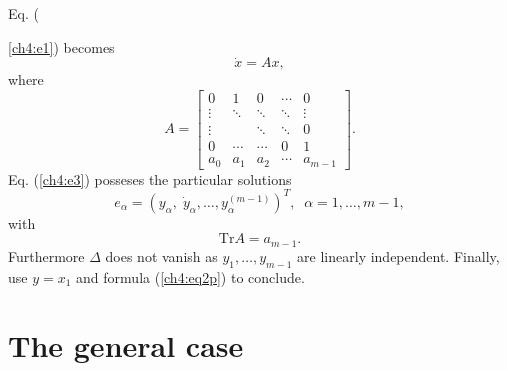 Eq. ({\ref{ch4:e1}) becomes
\begin{equation}
\dot x =Ax,\label{ch4:e3}
\end{equation}
where
\[A= \left [ \begin{array}{ccccc}
0 & 1 & 0 & \cdots &0\\
\vdots & \ddots  &\ddots &\ddots  &\vdots  \\
\vdots &  & \ddots & \ddots &0\\    
0 &\cdots &\cdots & 0 & 1\\
a_0 & a_1 & a_2 & \cdots  & a_{m-1}
\end{array} \right ]. \]
Eq. (\ref{ch4:e3}) posseses the particular solutions
\[e_{\alpha}=(y_{\alpha},\;\dot y_{\alpha},\ldots , y_{\alpha}^{(m-1)})^T,\;\;
\alpha=1,\ldots,m-1,\]
with
\[\mbox{Tr} A=a_{m-1} .\]
Furthermore $\Delta$ does not vanish as $y_1,\ldots ,y_{m-1}$ are
linearly independent.
Finally, use $ y=x_1 $ and formula (\ref{ch4:eq2p}) to conclude.

\section{ The general case}

}
